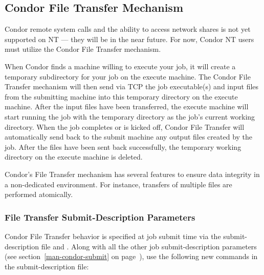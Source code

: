 \subsection{\label{sec:File-Transfer}Condor File Transfer Mechanism}

Condor remote system calls and the ability to access network shares is not
yet supported on NT --- they will be in the near future.  For now, Condor NT users must utilize
the Condor File Transfer mechanism.  

When Condor finds a machine willing to execute your job, it will create a
temporary subdirectory for your job on the execute machine.
The Condor File Transfer mechanism will then send via TCP the job executable(s)
and input files from the submitting machine into this temporary directory on the execute machine. 
After the input files have been transferred, the execute machine will start
running the job with the temporary directory as the job's current working
directory.
When the
job completes or is kicked off, Condor File Transfer will automatically send
back to the submit machine any output files created by the job.  After the
files have been sent back successfully, the temporary working directory on
the execute machine is deleted.

Condor's File Transfer mechanism has several features to ensure data
integrity in a non-dedicated environment.  For instance, transfers of
multiple files are performed atomically.

\subsubsection{File Transfer Submit-Description Parameters}
Condor File Transfer behavior is specified at job submit time via the
submit-description file and .  Along with all the other job
submit-description parameters (see section~\ref{man-condor-submit} on
page~\pageref{man-condor-submit}), use the following new commands in
the submit-description file:

